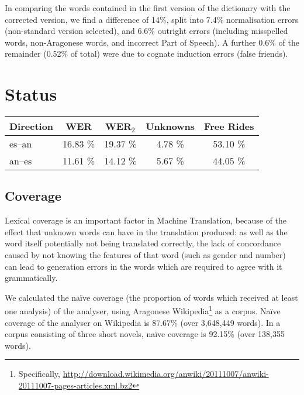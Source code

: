 \documentclass[10pt, a4paper]{article}
\begin{document}
  In comparing the words contained in the first version of the dictionary with the corrected version, we find a difference of 14\%, split into 7.4\% normalisation errors (non-standard version selected), and 6.6\% outright errors (including misspelled words, non-Aragonese words, and incorrect Part of Speech). A further 0.6\% of the remainder (0.52\% of total) were due to cognate induction errors (false friends).
  
  \section{Status}
  
  \begin{table*}
  \centering
  \begin{tabular}{|l|c|c|c|c|}
  \hline
  Direction    & WER & WER$_2$ & Unknowns & Free Rides\\
  \hline
  es--an        & 16.83 \% & 19.37 \%  & 4.78 \% & 53.10 \% \\
  an--es        & 11.61 \% & 14.12 \%  & 5.67 \% & 44.05 \% \\
  \hline
  \end{tabular}
    \caption{Evaluation results for both directions. Free rides are those unknown words which
       are identical in both the source and target language. Although they do not cause
       a degradation in translation quality, it is relevant to take them into account when
       evaluating the system. Unknown words are included as an indication of naïve coverage
       over the test sets.
       For brevity, we refer to the languages by their ISO 639-1 codes: {\tt es} for Spanish, and {\tt an} for Aragonese.}
    \label{table:quanteval}
  \end{table*}
  
  \subsection{Coverage}
  
  Lexical coverage is an important factor in Machine Translation, because of the effect that unknown words can have in the translation produced: as well as the word itself potentially not being translated correctly, the lack of concordance caused by not knowing the features of that word (such as gender and number) can lead to generation errors in the words which are required to agree with it grammatically.
  
We calculated the naïve coverage (the proportion of words which received at least one analysis) of the analyser, using Aragonese Wikipedia\footnote{Specifically, \url{http://download.wikimedia.org/anwiki/20111007/anwiki-20111007-pages-articles.xml.bz2}} as a corpus. Naïve coverage of the analyser on Wikipedia is 87.67\% (over 3,648,449 words).  In a corpus consisting of three short novels, naïve coverage is 92.15\% (over 138,355 words).
  
\end{document}
